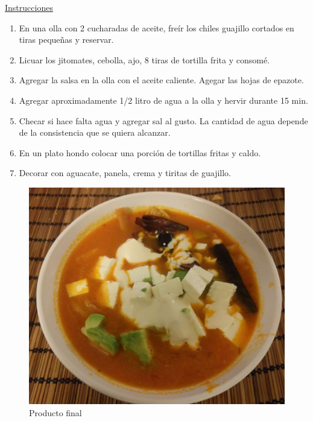 \underline{Instrucciones}
\begin{enumerate}
\item En una olla con 2 cucharadas de aceite, freír los chiles guajillo cortados en tiras pequeñas y reservar.
\item Licuar los jitomates, cebolla, ajo, 8 tiras de tortilla frita y consomé.
\item Agregar la salsa en la olla con el aceite caliente. Agegar las hojas de epazote.
\item Agregar aproximadamente 1/2 litro de agua a la olla y hervir durante 15 min.
\item Checar si hace falta agua y agregar sal al gusto. La cantidad de agua depende de la consistencia que se quiera alcanzar.
\item En un plato hondo colocar una porción de tortillas fritas y caldo.
\item Decorar con aguacate, panela, crema y tiritas de guajillo.
\end{enumerate}


\begin{figure}[H]
\centering
\includegraphics[scale=0.2]{recetas/figures/sopa_tortilla}
\caption{Producto final}
\end{figure}

